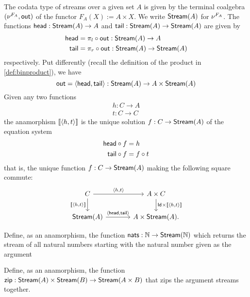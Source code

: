 \begin{exa}[Streams]
  The codata type of streams over a given set $A$ is given by the terminal coalgebra $(\Terminalcoalg{F_A}, \Out)$ of the functor $F_A (X) := A \times X$.
  We write $\Stream(A)$ for $\Terminalcoalg{F_A}$.
  The functions $\head : \Stream(A) \to A$ and $\tail : \Stream(A) \to \Stream(A)$
  are given by
  \begin{align*}
    \head &= \co{\Out}{\projl} : \Stream(A) \to A
    \\
    \tail &= \co{\Out}{\projr} : \Stream(A) \to \Stream(A)
  \end{align*}
  respectively. Put differently (recall the definition of the product in \cref{def:binproduct}), we have
  \[
    \Out = \langle \head, \tail \rangle : \Stream(A) \to A \times \Stream(A)
  \] 
  Given any two functions
  \begin{align*}
    h : C \to  A
    \\
    t : C \to C
  \end{align*}
  the anamorphism $\anam{\langle h, t \rangle }$ is the unique solution
  $f : C \to  \Stream(A)$
  of the equation system
  \begin{align*}
    \co{f} \head &= h
    \\
    \co f \tail &=  \co t f
  \end{align*}
  that is, the unique function $f : C \to \Stream(A)$ making the following square commute:
  \[
    \begin{tikzcd}[column sep = large]
      C
      \ar[r, "{\langle h, t \rangle}"]
      \ar[d, "\anam{\langle h, t \rangle}"']
      &
      A \times C
      \ar[d, "\Id \times \anam{\langle h, t \rangle}"]
      \\
      \Stream(A)
      \ar[r, "{\langle \head, \tail \rangle}"]
      &
      A \times \Stream(A).
    \end{tikzcd}
  \]
  
\end{exa}

\begin{exer}\label{exer:stream-of-nats}
  Define, as an anamorphism, the function $\nats : \NN \to \Stream(\NN)$ which returns the stream of all natural
  numbers starting with the natural number given as the argument
\end{exer}


\begin{exer}\label{exer:zip}
  Define, as an anamorphism, the function $\zip : \Stream(A) \times \Stream(B) \to \Stream(A \times B)$ that zips the argument streams together.
\end{exer}


